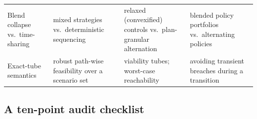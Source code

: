 \documentclass[preprint,11pt,authoryear]{elsarticle}
\theoremstyle{remark}
\begin{document}
\begin{table}[!htbp]
\begin{tabularx}{\textwidth}{@{}>{\raggedright\arraybackslash}p{}>{\raggedright\arraybackslash}X>{\raggedright\arraybackslash}X>{\raggedright\arraybackslash}X@{}}
\addlinespace
Blend collapse vs.\ time-sharing & mixed strategies vs.\ deterministic sequencing & relaxed (convexified) controls vs.\ plan-granular alternation & blended policy portfolios vs.\ alternating policies \\
\addlinespace
Exact-tube semantics & robust path-wise feasibility over a scenario set & viability tubes; worst-case reachability & avoiding transient breaches during a transition \\
\bottomrule
\end{tabularx}
\end{table}

\subsection{A ten-point audit checklist}
\end{document}
